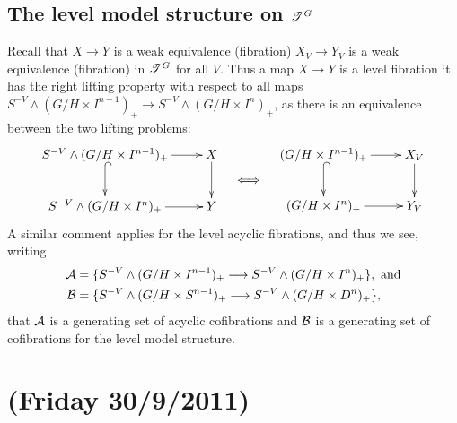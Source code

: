 \documentclass[11pt]{article}
\newcommand{\NewLecture}[3]{\section{#1 {\small(#2/#3/2011)}}}
\begin{document}
\begin{FifthWeek}
\subsection*{The level model structure on $\mathscr{T}^G$}
Recall that $X\to Y$ is a weak equivalence (fibration) \Iff $X_V\to Y_V$ is a weak equivalence (fibration) in $\mathscr{T}^G$ for all $V$. Thus a map $X\to Y$ is a level fibration \Iff it has the right lifting property with respect to all maps $S^{-V}\wedge (G/H\times I^{n-1})_+\to S^{-V}\wedge (G/H\times I^{n})_+$, as there is an equivalence between the two lifting problems: 
\[\xymatrix{
\ar@{^{(}->}[d]S^{-V}\wedge(G/H\times I^{n-1})_+\ar[r]&X\ar[d]\\
S^{-V}\wedge (G/H\times I^{n})_+\ar[r]&Y
}
\raisebox{-.7cm}{$\quad\iff\quad$}
\xymatrix{
\ar@{^{(}->}[d](G/H\times I^{n-1})_+\ar[r]&X_V\ar[d]\\
(G/H\times I^{n})_+\ar[r]&Y_V
}\]
A similar comment applies for the level acyclic fibrations, and thus we see, writing
\begin{align*}
\mathcal{A}&=\{S^{-V}\wedge (G/H\times I^{n-1})_+\longrightarrow S^{-V}\wedge (G/H\times I^{n})_+\},\text{ and}\\
\mathcal{B}&=\{S^{-V}\wedge (G/H\times S^{n-1})_+\longrightarrow S^{-V}\wedge (G/H\times D^{n})_+\},
\end{align*}
that $\mathcal{A}$ is a generating set of acyclic cofibrations and $\mathcal{B}$ is a generating set of cofibrations for the level model structure.
\NewLecture{}{Friday 30}{9}

\end{FifthWeek}
\end{document}
